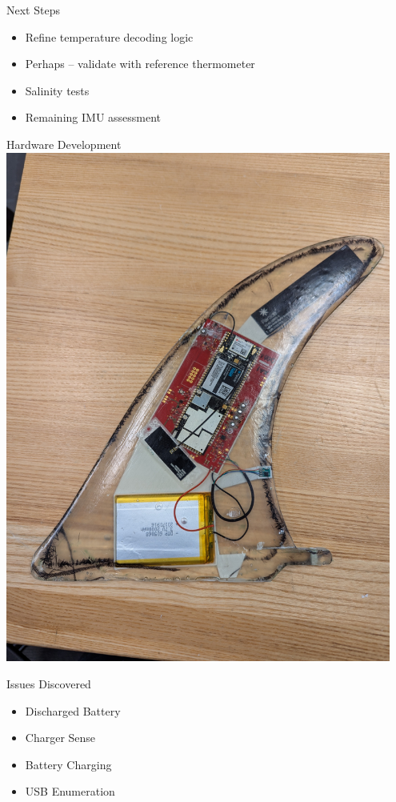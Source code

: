 \begin{frame}{Next Steps}
    \begin{itemize}
        \item Refine temperature decoding logic
        \item Perhaps -- validate with reference thermometer
        \item Salinity tests
        \item Remaining IMU assessment
    \end{itemize}
\end{frame}

\begin{frame}{Hardware Development}
    \centering
    \includegraphics[height=0.6\textheight,width=0.95\textwidth,keepaspectratio]{images/sf_sn0002_complete.jpg}
\end{frame}

\begin{frame}{Issues Discovered}
    \begin{itemize}
        \item Discharged Battery
        \item Charger Sense
        \item Battery Charging
        \item USB Enumeration
    \end{itemize}
\end{frame}

